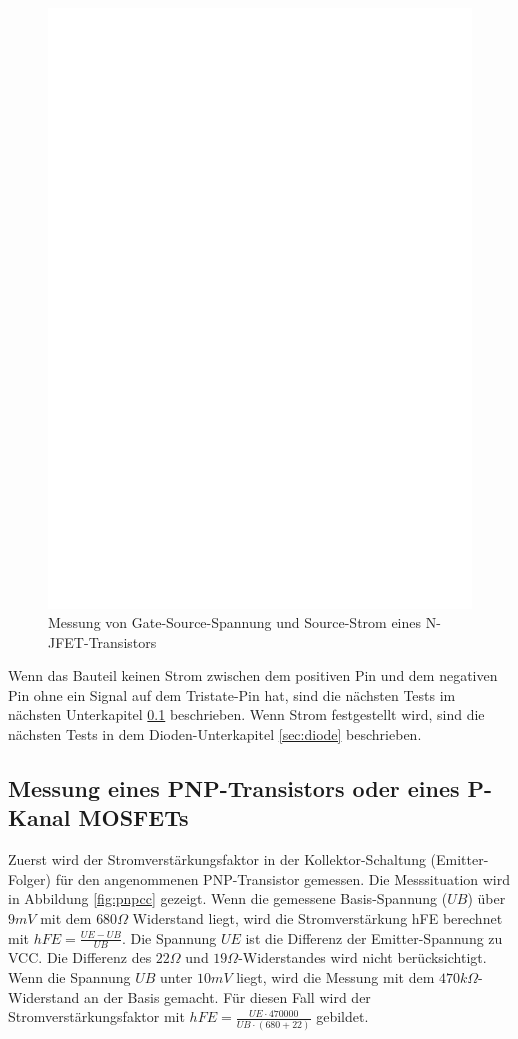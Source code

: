 \begin{figure}[H]
\centering
\includegraphics[]{../FIG/JFETcd.eps}
\caption{Messung von Gate-Source-Spannung und Source-Strom eines N-JFET-Transistors}
\label{fig:JFETcd}
\end{figure}

Wenn das Bauteil keinen Strom zwischen dem positiven Pin und dem negativen Pin ohne ein Signal
auf dem Tristate-Pin hat, sind die nächsten Tests im nächsten Unterkapitel \ref{sec:pnp} beschrieben.
Wenn Strom festgestellt wird, sind die nächsten Tests in dem Dioden-Unterkapitel \ref{sec:diode} beschrieben.

\subsection{Messung eines PNP-Transistors oder eines P-Kanal MOSFETs}
\label{sec:pnp}
Zuerst wird der Stromverstärkungsfaktor in der Kollektor-Schaltung (Emitter-Folger) für den angenommenen
PNP-Transistor gemessen.
Die Messsituation wird in Abbildung \ref{fig:pnpcc} gezeigt.
Wenn die gemessene Basis-Spannung (\(UB\)) über \(9mV\) mit dem \(680\Omega\) Widerstand liegt,
wird die Stromverstärkung hFE berechnet mit \(hFE = \frac{UE-UB}{UB}\). 
Die Spannung \(UE\) ist die Differenz der Emitter-Spannung zu VCC.
Die Differenz des \(22\Omega\) und \(19\Omega\)-Widerstandes wird nicht berücksichtigt.
Wenn die Spannung \(UB\) unter \(10mV\) liegt, wird die Messung mit dem \(470k\Omega\)-Widerstand an der Basis gemacht.
Für diesen Fall wird der Stromverstärkungsfaktor mit \(hFE = \frac{UE \cdot 470000}{UB \cdot (680+22)}\) gebildet.

